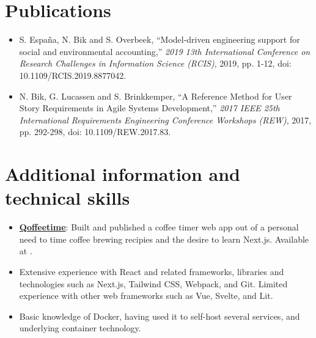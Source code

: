 \documentclass[10pt]{article}
\begin{document}
\section{Publications}
\label{sec:pubs}

\begin{itemize}
      \item S. España, N. Bik and S. Overbeek, \enquote{Model-driven engineering
                  support for social and environmental accounting,} \textit{2019 13th
                  International Conference on Research Challenges in Information Science (RCIS)},
            2019, pp. 1-12, doi:\\ 10.1109/RCIS.2019.8877042.
      \item N. Bik, G. Lucassen and S. Brinkkemper, \enquote{A Reference Method for
                  User Story Requirements in Agile Systems Development,} \textit{2017 IEEE 25th
                  International Requirements Engineering Conference Workshops (REW)}, 2017, pp.
            292-298, doi: 10.1109/REW.2017.83.
\end{itemize}

\section{Additional information and technical skills}
\label{sec:other}

\begin{itemize}
      \item \textbf{\underline{Qoffeetime}}: Built and published a coffee timer web
            app out of a personal need to time coffee brewing recipies and the desire to
            learn Next.js. Available at .
      \item Extensive experience with React and related frameworks, libraries and
            technologies such as Next.js, Tailwind CSS, Webpack, and Git. Limited
            experience with other web frameworks such as Vue, Svelte, and Lit.
      \item Basic knowledge of Docker, having used it to self-host several services,
            and underlying container technology.
\end{itemize}
\end{document}
